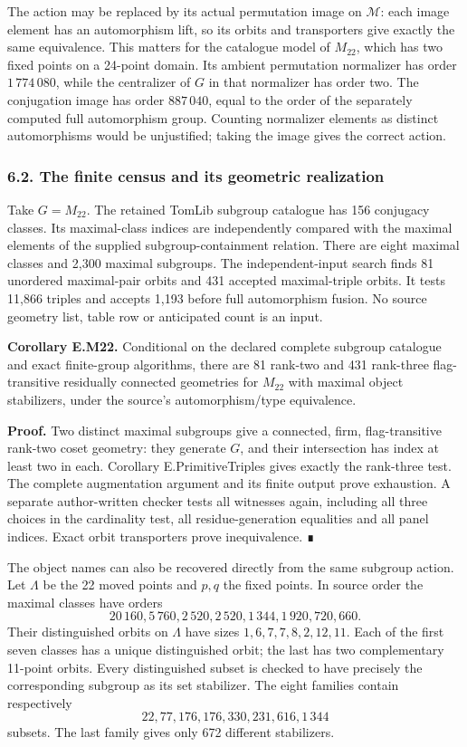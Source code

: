 \documentclass[
  11pt,
  a4paper,
]{article}
\begin{document}
The action may be replaced by its actual permutation image on
\(\mathcal M\): each image element has an automorphism lift, so its
orbits and transporters give exactly the same equivalence. This matters
for the catalogue model of \(M_{22}\), which has two fixed points on a
24-point domain. Its ambient permutation normalizer has order
\(1\,774\,080\), while the centralizer of \(G\) in that normalizer has
order two. The conjugation image has order \(887\,040\), equal to the
order of the separately computed full automorphism group. Counting
normalizer elements as distinct automorphisms would be unjustified;
taking the image gives the correct action.

\subsubsection{6.2. The finite census and its geometric
realization}\label{the-finite-census-and-its-geometric-realization}

Take \(G=M_{22}\). The retained TomLib subgroup catalogue has 156
conjugacy classes. Its maximal-class indices are independently compared
with the maximal elements of the supplied subgroup-containment relation.
There are eight maximal classes and 2,300 maximal subgroups. The
independent-input search finds 81 unordered maximal-pair orbits and 431
accepted maximal-triple orbits. It tests 11,866 triples and accepts
1,193 before full automorphism fusion. No source geometry list, table
row or anticipated count is an input.

\textbf{Corollary E.M22.} Conditional on the declared complete subgroup
catalogue and exact finite-group algorithms, there are 81 rank-two and
431 rank-three flag-transitive residually connected geometries for
\(M_{22}\) with maximal object stabilizers, under the source's
automorphism/type equivalence.

\textbf{Proof.} Two distinct maximal subgroups give a connected, firm,
flag-transitive rank-two coset geometry: they generate \(G\), and their
intersection has index at least two in each. Corollary
E.PrimitiveTriples gives exactly the rank-three test. The complete
augmentation argument and its finite output prove exhaustion. A separate
author-written checker tests all witnesses again, including all three
choices in the cardinality test, all residue-generation equalities and
all panel indices. Exact orbit transporters prove inequivalence. ∎

The object names can also be recovered directly from the same subgroup
action. Let \(\Lambda\) be the 22 moved points and \(p,q\) the fixed
points. In source order the maximal classes have orders \[
20\,160, 5\,760, 2\,520, 2\,520, 1\,344, 1\,920, 720, 660.
\] Their distinguished orbits on \(\Lambda\) have sizes
\(1,6,7,7,8,2,12,11\). Each of the first seven classes has a unique
distinguished orbit; the last has two complementary 11-point orbits.
Every distinguished subset is checked to have precisely the
corresponding subgroup as its set stabilizer. The eight families contain
respectively \[
22, 77, 176, 176, 330, 231, 616, 1\,344
\] subsets. The last family gives only 672 different stabilizers.
\end{document}
